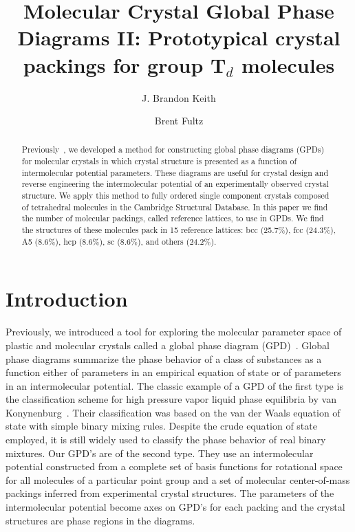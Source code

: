 \documentclass[preprint]{revtex4}              %
\begin{document}
\title{Molecular Crystal Global Phase Diagrams II: Prototypical crystal packings for group T$_d$ molecules}


\author{J. Brandon Keith}
\author{Brent Fultz}



\begin{abstract}
Previously~\cite{Keith04c,Mettes04}, we developed a method for
constructing global phase diagrams (GPDs) for molecular crystals in
which crystal structure is presented as a function of intermolecular
potential parameters. These diagrams are useful for crystal design
and reverse engineering the intermolecular potential of an
experimentally observed crystal structure. We apply this method to
fully ordered single component crystals composed of tetrahedral
molecules in the Cambridge Structural Database. In this paper we
find the number of molecular packings, called reference lattices, to
use in GPDs. We find the structures of these molecules pack in 15
reference lattices: bcc (25.7\%), fcc (24.3\%), A5 (8.6\%), hcp
(8.6\%), sc (8.6\%), and others (24.2\%).
\end{abstract}

\maketitle                        %

\section{Introduction}

Previously, we introduced a tool for exploring the molecular
parameter space of plastic and molecular crystals called a global
phase diagram (GPD)~\cite{Keith04c,Mettes04}. Global phase diagrams
summarize the phase behavior of a class of substances as a function
either of parameters in an empirical equation of state or of
parameters in an intermolecular potential. The classic example of a
GPD of the first type is the classification scheme for high pressure
vapor liquid phase equilibria by van
Konynenburg~\cite{VanKonynenburg80}. Their classification was based
on the van der Waals equation of state with simple binary mixing
rules. Despite the crude equation of state employed, it is still
widely used to classify the phase behavior of real binary mixtures.
Our GPD's are of the second type. They use an intermolecular
potential constructed from a complete set of basis functions for
rotational space for all molecules of a particular point group and a
set of molecular center-of-mass packings inferred from experimental
crystal structures. The parameters of the intermolecular potential
become axes on GPD's for each packing and the crystal structures are
phase regions in the diagrams.
\end{document}
